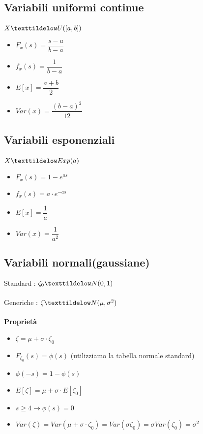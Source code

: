 \subsection{Variabili uniformi continue}
$X \texttildelow U([a, b])$ 
\begin{itemize}
	\item $F_{x}(s) = \dfrac{s - a}{b - a}$ 
	\item $f_{x}(s) = \dfrac{1}{b - a}$	
	\item $E[x] = \dfrac{a + b}{2}$
	\item $Var(x) = \dfrac{(b - a)^2}{12}$
\end{itemize}
\subsection{Variabili esponenziali}
$X \texttildelow Exp(a)$
\begin{itemize}
	\item $F_{x}(s) = 1 - e^{as}$ 
	\item $f_{x}(s) = a \cdot e^{-as}$	
	\item $E[x] = \dfrac{1}{a}$
	\item $Var(x) = \dfrac{1}{a^2}$
\end{itemize}
\newpage
\subsection{Variabili normali(gaussiane)}
Standard : $\zeta_0 \texttildelow N(0,1)$ \\ \\
Generiche : $\zeta \texttildelow N(\mu,\sigma^2)$ \\ \\
\textbf{Proprietà}
\begin{itemize}
	\item $\zeta = \mu + \sigma \cdot \zeta_0$
	\item $F_{\zeta_0}(s) = \phi(s)$ (utilizziamo la tabella normale standard)
	\item $\phi(-s) = 1 - \phi(s)$
	\item $E[\zeta] = \mu + \sigma \cdot E[\zeta_0]$
	\item $s \geq 4 \rightarrow \phi(s) = 0$
	\item $Var(\zeta) = Var(\mu + \sigma \cdot \zeta_0) = Var(\sigma \zeta_0) = \sigma Var(\zeta_0) = \sigma^2$
\end{itemize}
